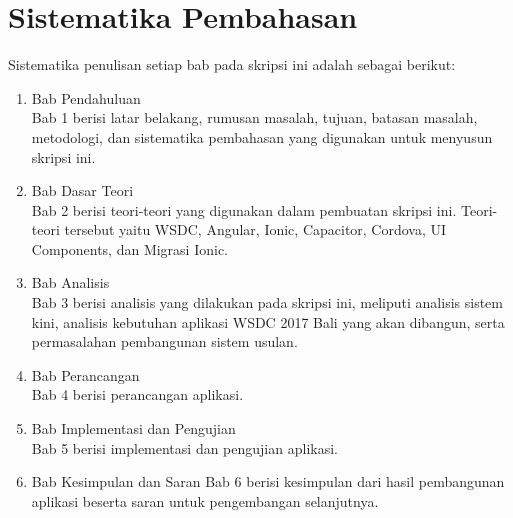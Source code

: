 \section{Sistematika Pembahasan}
\label{sec:sispem}

Sistematika penulisan setiap bab pada skripsi ini adalah sebagai berikut:
\begin{enumerate}
	\item Bab Pendahuluan \\
	Bab 1 berisi latar belakang, rumusan masalah, tujuan, batasan masalah, metodologi, dan sistematika pembahasan yang digunakan untuk menyusun skripsi ini.
	\item Bab Dasar Teori \\
	Bab 2 berisi teori-teori yang digunakan dalam pembuatan skripsi ini. Teori-teori tersebut yaitu WSDC, Angular, Ionic, Capacitor, Cordova, UI Components, dan Migrasi Ionic.
	\item Bab Analisis \\
	Bab 3 berisi analisis yang dilakukan pada skripsi ini, meliputi analisis sistem kini, analisis kebutuhan aplikasi WSDC 2017 Bali yang akan dibangun, serta permasalahan pembangunan sistem usulan.
	\item Bab Perancangan \\
	Bab 4 berisi perancangan aplikasi.
	\item Bab Implementasi dan Pengujian \\
	Bab 5 berisi implementasi dan pengujian aplikasi.
	\item Bab Kesimpulan dan Saran
	Bab 6 berisi kesimpulan dari hasil pembangunan aplikasi beserta saran untuk pengembangan selanjutnya.
	\end{enumerate}